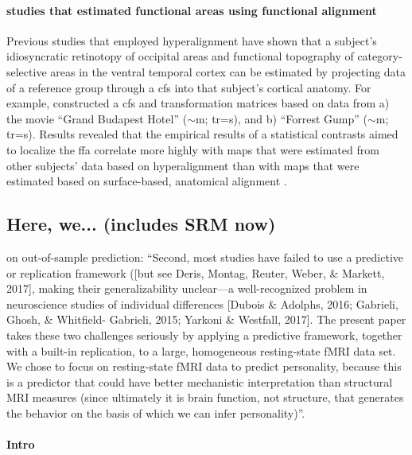 \paragraph{studies that estimated functional areas using functional alignment}

Previous studies \citep{jiahui2020predicting, guntupalli2016model,
haxby2011common} that employed hyperalignment have shown that a subject's
idiosyncratic retinotopy of occipital areas and functional topography of
category-selective areas in the ventral temporal cortex can be estimated by
projecting data of a reference group through a \ac{cfs} into that subject's
cortical anatomy.
For example, \citep{jiahui2020predicting} constructed a \ac{cfs} and
transformation matrices based on data from a) the movie ``Grand Budapest Hotel''
($\sim$\unit[50]{m}; \ac{tr}=\unit[1]{s}), and b) ``Forrest Gump''
($\sim$\unit[120]{m}; \ac{tr}=\unit[2]{s}).
Results revealed that the empirical results of a statistical contrasts aimed to
localize the \ac{ffa} correlate more highly with maps that were estimated from
other subjects' data based on hyperalignment than with maps that were estimated
based on surface-based, anatomical alignment \citep{jiahui2020predicting}.


\subsection{Here, we... (includes SRM now)}

\citet{dubois2018resting} on out-of-sample prediction: ``Second, most studies
have failed to use a predictive or replication framework ([but see Deris,
Montag, Reuter, Weber, \& Markett, 2017], making their generalizability
unclear—a well-recognized problem in neuroscience studies of individual
differences [Dubois \& Adolphs, 2016; Gabrieli, Ghosh, \& Whitfield- Gabrieli,
2015; Yarkoni \& Westfall, 2017]. The present paper takes these two challenges
seriously by applying a predictive framework, together with a built-in
replication, to a large, homogeneous resting-state fMRI data set. We chose to
focus on resting-state fMRI data to predict personality, because this is a
predictor that could have better mechanistic interpretation than structural MRI
measures (since ultimately it is brain function, not structure, that generates
the behavior on the basis of which we can infer personality)''.


\paragraph{Intro}

